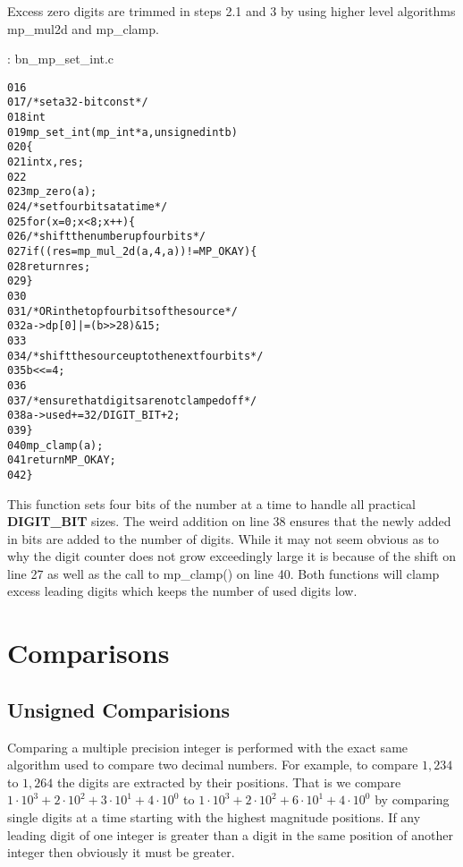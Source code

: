 \documentclass[b5paper]{book}
\begin{document}
Excess zero digits are trimmed in steps 2.1 and 3 by using higher level algorithms mp\_mul2d and mp\_clamp.

\vspace{+3mm}\begin{small}
\hspace{-5.1mm}{\bf File}: bn\_mp\_set\_int.c
\vspace{-3mm}
\begin{alltt}
016   
017   /* set a 32-bit const */
018   int
019   mp_set_int (mp_int * a, unsigned int b)
020   \{
021     int     x, res;
022   
023     mp_zero (a);
024     /* set four bits at a time */
025     for (x = 0; x < 8; x++) \{
026       /* shift the number up four bits */
027       if ((res = mp_mul_2d (a, 4, a)) != MP_OKAY) \{
028         return res;
029       \}
030   
031       /* OR in the top four bits of the source */
032       a->dp[0] |= (b >> 28) & 15;
033   
034       /* shift the source up to the next four bits */
035       b <<= 4;
036   
037       /* ensure that digits are not clamped off */
038       a->used += 32 / DIGIT_BIT + 2;
039     \}
040     mp_clamp (a);
041     return MP_OKAY;
042   \}
\end{alltt}
\end{small}

This function sets four bits of the number at a time to handle all practical \textbf{DIGIT\_BIT} sizes.  The weird
addition on line 38 ensures that the newly added in bits are added to the number of digits.  While it may not 
seem obvious as to why the digit counter does not grow exceedingly large it is because of the shift on line 27 
as well as the  call to mp\_clamp() on line 40.  Both functions will clamp excess leading digits which keeps 
the number of used digits low.

\section{Comparisons}
\subsection{Unsigned Comparisions}
Comparing a multiple precision integer is performed with the exact same algorithm used to compare two decimal numbers.  For example,
to compare $1,234$ to $1,264$ the digits are extracted by their positions.  That is we compare $1 \cdot 10^3 + 2 \cdot 10^2 + 3 \cdot 10^1 + 4 \cdot 10^0$
to $1 \cdot 10^3 + 2 \cdot 10^2 + 6 \cdot 10^1 + 4 \cdot 10^0$ by comparing single digits at a time starting with the highest magnitude 
positions.  If any leading digit of one integer is greater than a digit in the same position of another integer then obviously it must be greater.  
\end{document}
